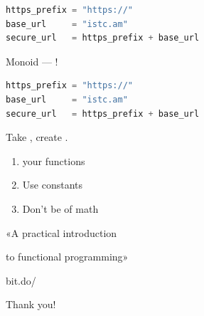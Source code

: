 \documentclass[aspectratio=169]{beamer}
\begin{document}
\begin{frame}[fragile,t]
    \begin{lstlisting}[language=Python]
https_prefix = "https://"
base_url     = "istc.am"
secure_url   = https_prefix + base_url
    \end{lstlisting}

    \vspace{2em}

    \centering
        \Huge
            Monoid --- !
\end{frame}

\begin{frame}[fragile,t]
    \begin{lstlisting}[language=Python]
https_prefix = "https://"
base_url     = "istc.am"
secure_url   = https_prefix + base_url
    \end{lstlisting}

    \vspace{2em}

    \centering
        \Huge
            Take , create .
\end{frame}

\begin{frame}
    \centering
\end{frame}

\begin{frame}
    \centering
\end{frame}

\begin{frame}
    \Huge
        \begin{enumerate}[ leftmargin=1.5em
                         , itemsep=1em
                         , labelsep=0.5em
                         , label=\color{darkelectricblue}\Roman*
                         ]
            \item {} your functions
            \item Use  constants
            \item Don't be  of math
        \end{enumerate}
\end{frame}

\begin{frame}
    \centering
\end{frame}

\begin{frame}
    \Huge{«A practical introduction}

    \Huge{\hspace{0.59em}to functional programming»}

    \vspace{1em}

    \Huge{bit.do/}
\end{frame}

\begin{frame}
    \centering
        \Huge{Thank you!}

\end{frame}
\end{document}
